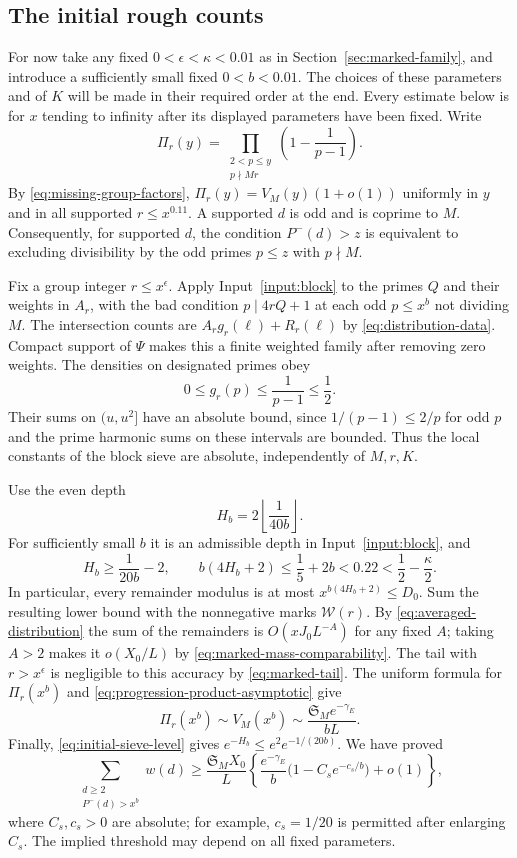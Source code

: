 \subsection{The initial rough counts}

For now take any fixed $0<\epsilon<\kappa<0.01$ as in
Section~\ref{sec:marked-family}, and introduce a sufficiently small
fixed $0<b<0.01$.  The choices of these parameters and of $K$ will be
made in their required order at the end.  Every estimate below is for
$x$ tending to infinity after its displayed parameters have been fixed.
Write
\[
 \Pi_r(y)=\prod_{\substack{2<p\le y\\p\nmid Mr}}
                 \left(1-\frac1{p-1}\right).
\]
By \eqref{eq:missing-group-factors},
$\Pi_r(y)=V_M(y)(1+o(1))$ uniformly in $y$ and in all supported
$r\le x^{0.11}$.  A supported $d$ is odd and is coprime to $M$.
Consequently, for supported $d$, the condition $P^-(d)>z$ is equivalent
to excluding divisibility by the odd primes $p\le z$ with $p\nmid M$.

Fix a group integer $r\le x^\epsilon$.  Apply Input~\ref{input:block}
to the primes $Q$ and their weights in $A_r$, with the bad condition
$p\mid4rQ+1$ at each odd $p\le x^b$ not dividing $M$.  The intersection
counts are $A_rg_r(\ell)+R_r(\ell)$ by
\eqref{eq:distribution-data}.  Compact support of $\Psi$ makes this
a finite weighted family after removing zero weights.  The densities
on designated primes
obey
\[
 0\le g_r(p)\le\frac1{p-1}\le\frac12.
\]
Their sums on $(u,u^2]$ have an absolute bound, since
$1/(p-1)\le2/p$ for odd $p$ and the prime harmonic sums on these
intervals are bounded.  Thus the local constants of the block sieve
are absolute, independently of $M,r,K$.

Use the even depth
\[
 H_b=2\left\lfloor\frac1{40b}\right\rfloor.
\]
For sufficiently small $b$ it is an admissible depth in
Input~\ref{input:block}, and
\begin{equation}\label{eq:initial-sieve-level}
 H_b\ge\frac1{20b}-2,
 \qquad
 b(4H_b+2)\le\frac15+2b<0.22<\frac12-\frac\kappa2.
\end{equation}
In particular, every remainder modulus is at most
$x^{b(4H_b+2)}\le D_0$.  Sum the resulting lower bound with the
nonnegative marks $\mathcal W(r)$.  By
\eqref{eq:averaged-distribution} the sum of the remainders is
$O(xJ_0L^{-A})$ for any fixed $A$; taking $A>2$ makes it $o(X_0/L)$
by \eqref{eq:marked-mass-comparability}.  The tail with
$r>x^\epsilon$ is negligible to this accuracy by
\eqref{eq:marked-tail}.  The uniform formula for $\Pi_r(x^b)$ and
\eqref{eq:progression-product-asymptotic} give
\[
 \Pi_r(x^b)\sim V_M(x^b)
       \sim\frac{\mathfrak S_M e^{-\gamma_E}}{bL}.
\]
Finally, \eqref{eq:initial-sieve-level} gives
$e^{-H_b}\le e^2e^{-1/(20b)}$.  We have proved
\begin{equation}\label{eq:initial-rough-mass}
 \sum_{\substack{d\ge2\\P^-(d)>x^b}}w(d)
 \ge\frac{\mathfrak S_M X_0}{L}
 \left\{\frac{e^{-\gamma_E}}{b}
              \bigl(1-C_se^{-c_s/b}\bigr)+o(1)\right\},
\end{equation}
where $C_s,c_s>0$ are absolute; for example, $c_s=1/20$ is permitted
after enlarging $C_s$.  The implied threshold may depend on all fixed
parameters.


